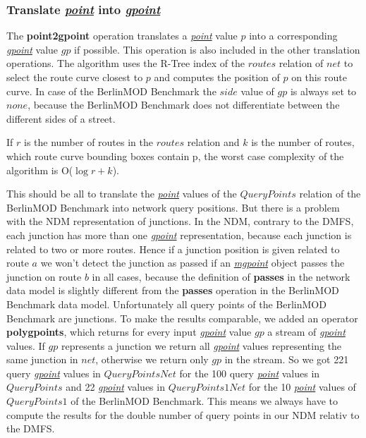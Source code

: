 \documentclass[a4paper]{article}
\newcommand{\bmodb} {BerlinMOD Benchmark}
\newcommand{\op}[1]{\textbf{#1}}
\newcommand{\dt}[1]{\textsl{\underline{#1}}}
\begin{document}
\subsubsection{Translate \dt{point} into \dt{gpoint}}
The \op{point2gpoint} operation translates a \dt{point} value $p$ into a corresponding
\dt{gpoint} value $gp$ if possible. This operation is also included in the other translation
operations. The algorithm uses the R-Tree index of the
$routes$ relation of $net$ to select the route curve closest to $p$ and computes the
position of $p$ on this route curve. In case of the \bmodb{} the $side$ value of
$gp$ is always set to $none$, because the \bmodb{} does not differentiate between
the different sides of a street.

If $r$ is the number of routes in the $routes$ relation
and $k$ is the number of routes, which route curve bounding boxes contain p,
the worst case complexity of the algorithm is O($\log{r} + k$).

This should be all to translate the \dt{point} values of the $QueryPoints$
relation of the \bmodb{} into network query positions. But there is a problem with
the NDM representation of junctions. In the NDM, contrary to the DMFS, each junction
has more than one \dt{gpoint} representation, because each junction is related to
two or more routes. Hence if a junction position is given related to route $a$
we won't detect the junction as passed if an \dt{mgpoint} object passes the junction
on route $b$ in all cases, because the definition of \op{passes} in the network
data model is slightly different from the \op{passes} operation in the \bmodb{} data model.
Unfortunately all query points of the \bmodb{} are junctions. To make the results
comparable, we added an operator \op{polygpoints}, which returns for every input
\dt{gpoint} value $gp$ a stream of \dt{gpoint} values. If $gp$ represents a junction
we return all \dt{gpoint} values representing the same junction in $net$,
otherwise we return only $gp$ in the stream. So we got 221 query \dt{gpoint}
values in $QueryPointsNet$ for the 100 query \dt{point} values in
$QueryPoints$ and 22 \dt{gpoint} values in $QueryPoints1Net$ for the
10 \dt{point} values of $QueryPoints1$ of the \bmodb{}. This means we always have
to compute the results for the double number of query points in our NDM relativ
to the DMFS.
\end{document}
